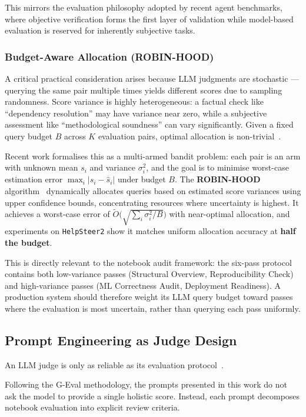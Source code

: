 \documentclass[11pt, a4paper]{article}
\begin{document}
This mirrors the evaluation philosophy adopted by recent agent benchmarks,
where objective verification forms the first layer of validation while
model-based evaluation is reserved for inherently subjective tasks.

\subsubsection*{Budget-Aware Allocation (ROBIN-HOOD)}

A critical practical consideration arises because LLM judgments are
stochastic --- querying the same pair multiple times yields different scores
due to sampling randomness. Score variance is highly heterogeneous: a factual
check like ``dependency resolution'' may have variance near zero, while a
subjective assessment like ``methodological soundness'' can vary
significantly. Given a fixed query budget $B$ across $K$ evaluation pairs,
optimal allocation is non-trivial~\cite{saha2026robinhood}.

Recent work formalises this as a multi-armed bandit problem: each pair is an
arm with unknown mean $s_i$ and variance $\sigma_i^2$, and the goal is to
minimise worst-case estimation error $\max_i |s_i - \hat{s}_i|$ under budget
$B$. The \textbf{ROBIN-HOOD} algorithm~\cite{saha2026robinhood} dynamically
allocates queries based on estimated score variances using upper confidence
bounds, concentrating resources where uncertainty is highest. It achieves a
worst-case error of $\tilde{O}\big(\sqrt{\sum_i \sigma_i^2 / B}\big)$ with
near-optimal allocation, and experiments on \texttt{HelpSteer2} show it
matches uniform allocation accuracy at \textbf{half the budget}.

This is directly relevant to the notebook audit framework: the six-pass
protocol contains both low-variance passes (Structural Overview,
Reproducibility Check) and high-variance passes (ML Correctness Audit,
Deployment Readiness). A production system should therefore weight its LLM
query budget toward passes where the evaluation is most uncertain, rather
than querying each pass uniformly.

\subsection{Prompt Engineering as Judge Design}

An LLM judge is only as reliable as its evaluation
protocol~\cite{liu2023geval}.

Following the G-Eval methodology, the prompts presented in this work do not
ask the model to provide a single holistic score. Instead, each prompt
decomposes notebook evaluation into explicit review criteria.
\end{document}
